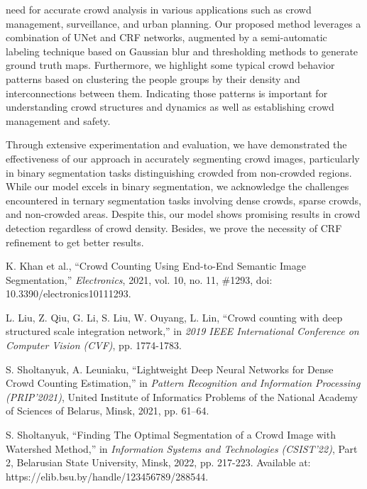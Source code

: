 \documentclass{article}
\begin{document}
\begin{multicols}{2}

\justifying
\normalsize \noindent  need for accurate crowd analysis in various applications such as crowd management, surveillance, and urban planning. Our proposed method leverages a combination of UNet and CRF networks, augmented by a semi-automatic labeling technique based on Gaussian blur and thresholding methods to generate ground truth maps. Furthermore, we highlight some typical crowd behavior patterns based on clustering the people groups by their density and interconnections between them. Indicating those patterns is important for understanding crowd structures and dynamics as well as establishing crowd management and safety.
\justifying
\par \normalsize Through  extensive experimentation and evaluation, we have demonstrated the effectiveness of our approach in accurately segmenting crowd images, particularly in binary segmentation tasks distinguishing crowded from non-crowded regions. While our model excels in binary segmentation, we acknowledge the challenges encountered in ternary segmentation tasks involving dense crowds, sparse crowds, and non-crowded areas. Despite this, our model shows promising results in crowd detection regardless of crowd density. Besides, we prove the necessity of CRF refinement to get better results. \\ 



\begin{thebibliography}{99}
\setlength{\itemsep}{0pt}
\tiny

K. Khan et al., ``Crowd Counting Using End-to-End Semantic Image Segmentation,'' \textit{Electronics}, 2021, vol. 10, no. 11, \#1293, doi: 10.3390/electronics10111293.

L. Liu, Z. Qiu, G. Li, S. Liu, W. Ouyang, L. Lin, ``Crowd counting with deep structured scale integration network,'' in \textit{2019 IEEE International Conference on Computer Vision (CVF)}, pp. 1774-1783.

S. Sholtanyuk, A. Leuniaku, ``Lightweight Deep Neural Networks for Dense Crowd Counting Estimation,'' in \textit{Pattern Recognition and Information Processing (PRIP'2021)}, United Institute of Informatics Problems of the National Academy of Sciences of Belarus, Minsk, 2021, pp. 61–64.

S. Sholtanyuk, ``Finding The Optimal Segmentation of a Crowd Image with Watershed Method,'' in \textit{Information Systems and Technologies (CSIST'22)}, Part 2, Belarusian State University, Minsk, 2022, pp. 217-223. Available at: https://elib.bsu.by/handle/123456789/288544.


\end{thebibliography}
\end{multicols}
\end{document}
